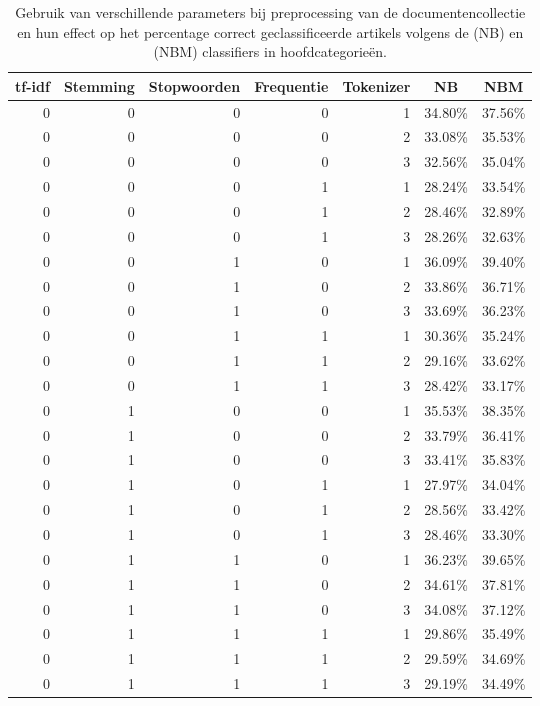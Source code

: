 \begin{longtable}{rrrrrrr}
	\caption{Gebruik van verschillende parameters bij preprocessing van de documentencollectie  en hun effect op het percentage correct geclassificeerde artikels volgens de  (NB) en  (NBM) classifiers in hoofdcategorie\"en.}\\
	\toprule
	\multicolumn{1}{c}{\textbf{tf-idf}} & \multicolumn{1}{c}{\textbf{Stemming}} & \multicolumn{1}{c}{\textbf{Stopwoorden}} & \multicolumn{1}{c}{\textbf{Frequentie}} & \multicolumn{1}{c}{\textbf{Tokenizer}} & \multicolumn{1}{c}{\textbf{NB}} & \multicolumn{1}{c}{\textbf{NBM}} \\
	\midrule
0	& 0	& 0	& 0	& 1	& 34.80\%	& 37.56\% \\
0	& 0	& 0	& 0	& 2	& 33.08\%	& 35.53\% \\
0	& 0	& 0	& 0	& 3	& 32.56\%	& 35.04\% \\
0	& 0	& 0	& 1	& 1	& 28.24\%	& 33.54\% \\
0	& 0	& 0	& 1	& 2	& 28.46\%	& 32.89\% \\
0	& 0	& 0	& 1	& 3	& 28.26\%	& 32.63\% \\
0	& 0	& 1	& 0	& 1	& 36.09\%	& 39.40\% \\
0	& 0	& 1	& 0	& 2	& 33.86\%	& 36.71\% \\
0	& 0	& 1	& 0	& 3	& 33.69\%	& 36.23\% \\
0	& 0	& 1	& 1	& 1	& 30.36\%	& 35.24\% \\
0	& 0	& 1	& 1	& 2	& 29.16\%	& 33.62\% \\
0	& 0	& 1	& 1	& 3	& 28.42\%	& 33.17\% \\
0	& 1	& 0	& 0	& 1	& 35.53\%	& 38.35\% \\
0	& 1	& 0	& 0	& 2	& 33.79\%	& 36.41\% \\
0	& 1	& 0	& 0	& 3	& 33.41\%	& 35.83\% \\
0	& 1	& 0	& 1	& 1	& 27.97\%	& 34.04\% \\
0	& 1	& 0	& 1	& 2	& 28.56\%	& 33.42\% \\
0	& 1	& 0	& 1	& 3	& 28.46\%	& 33.30\% \\
0	& 1	& 1	& 0	& 1	& 36.23\%	& 39.65\% \\
0	& 1	& 1	& 0	& 2	& 34.61\%	& 37.81\% \\
0	& 1	& 1	& 0	& 3	& 34.08\%	& 37.12\% \\
0	& 1	& 1	& 1	& 1	& 29.86\%	& 35.49\% \\
0	& 1	& 1	& 1	& 2	& 29.59\%	& 34.69\% \\
0	& 1	& 1	& 1	& 3	& 29.19\%	& 34.49\% \\

\end{longtable}
